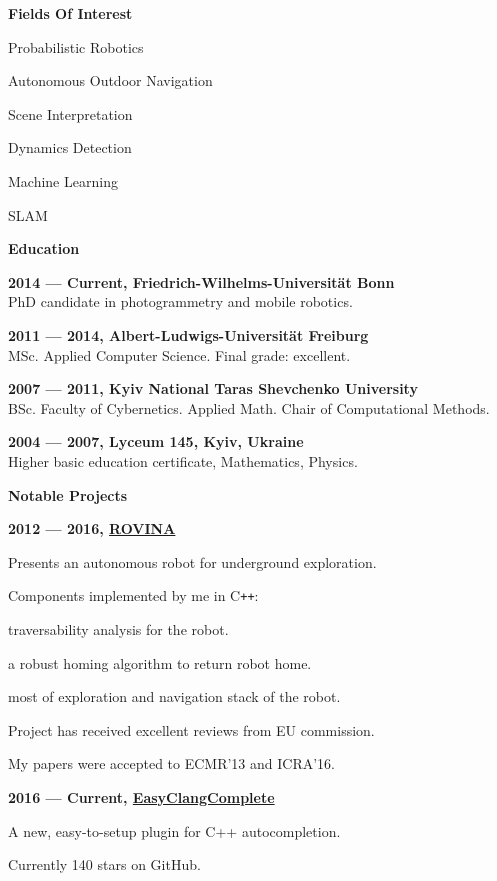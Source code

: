 \documentclass[a4paper,12pt,final]{memoir}
\newcommand{\SmallSep}{\vspace{0.5em}}
\newcommand{\CVSection}[1]
	{\Large\textbf{#1}\par
	\SmallSep\normalsize\normalfont}
\newcommand{\CVItem}[1]
	{\textbf{\color{MidnightBlue} #1}}
\begin{document}
	\CVSection{Fields Of Interest}
	\begin{compactitem}[\color{MidnightBlue}$\circ$]
		\item Probabilistic Robotics
		\item Autonomous Outdoor Navigation
		\item Scene Interpretation
		\item Dynamics Detection
		\item Machine Learning
		\item SLAM
	\end{compactitem}
	\SmallSep

\vfill
\framebreak{}

\CVSection{Education}
\CVItem{2014 --- Current, Friedrich-Wilhelms-Universit\"at Bonn}\\
PhD candidate in photogrammetry and mobile robotics.
\SmallSep{}

\CVItem{2011 --- 2014, Albert-Ludwigs-Universit\"at Freiburg}\\
MSc. Applied Computer Science. Final grade: excellent.
\SmallSep{}

\CVItem{2007 --- 2011, Kyiv National Taras Shevchenko University}\\
BSc. Faculty of Cybernetics. Applied Math.
\newline Chair of Computational Methods.
\SmallSep{}

\CVItem{2004 --- 2007, Lyceum 145, Kyiv, Ukraine}\\
Higher basic education certificate, Mathematics, Physics.
\SmallSep{}


\CVSection{Notable Projects}
\CVItem{2012 --- 2016, \href{http://www.rovina-project.eu/}{ROVINA}}
\begin{compactitem}[\color{MidnightBlue}$\circ$]
	\item Presents an autonomous robot for underground exploration.
	\item Components implemented by me in C\texttt{++}:
	\begin{compactitem}[\color{MidnightBlue}$-$]
	 	\item traversability analysis for the robot.
	 	\item a robust homing algorithm to return robot home.
		\item most of exploration and navigation stack of the robot.
	 \end{compactitem}
	\item Project has received excellent reviews from EU commission.
	\item My papers were accepted to ECMR'13 and ICRA'16.
\end{compactitem}
\CVItem{2016 --- Current, \href{https://github.com/niosus/EasyClangComplete}{EasyClangComplete}}
\begin{compactitem}[\color{MidnightBlue}$\circ$]
	\item A new, easy-to-setup plugin for C++ autocompletion.
	\item Currently 140 stars on GitHub.
\end{compactitem}
\SmallSep
\end{document}
